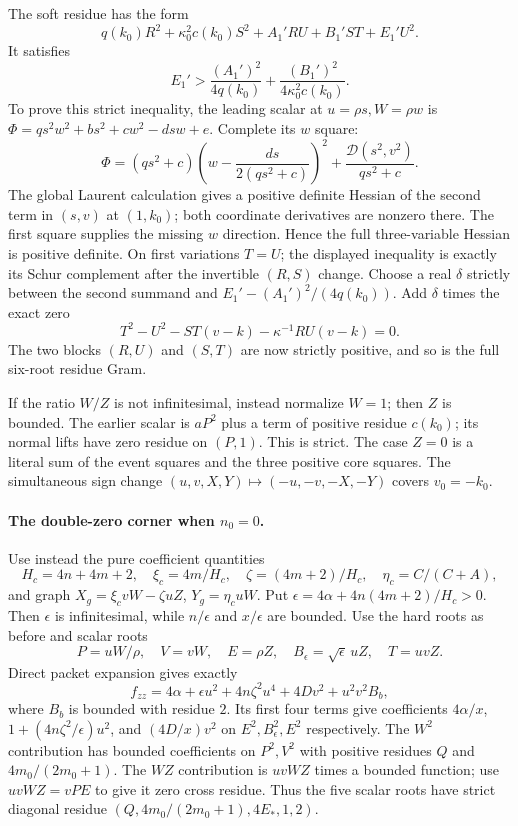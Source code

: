 The soft residue has the form
\[
 q(k_0)R^2+\kappa_0^2c(k_0)S^2+A_1'RU+B_1'ST+E_1'U^2.
\]
It satisfies
\[
 E_1'>\frac{(A_1')^2}{4q(k_0)}+
          \frac{(B_1')^2}{4\kappa_0^2c(k_0)}.
\]
To prove this strict inequality, the leading scalar at
$u=\rho s,W=\rho w$ is
$\Phi=q s^2w^2+b s^2+c w^2-dsw+e$.
Complete its $w$ square:
\[
 \Phi=(qs^2+c)\left(w-\frac{ds}{2(qs^2+c)}\right)^2
           +\frac{\mathcal D(s^2,v^2)}{qs^2+c}.
\]
The global Laurent calculation gives a positive definite Hessian of
the second term in $(s,v)$ at $(1,k_0)$; both coordinate derivatives
are nonzero there.  The first square supplies the missing $w$
direction.  Hence the full three-variable Hessian is positive
definite.  On first variations $T=U$; the displayed inequality is
exactly its Schur complement after the invertible $(R,S)$ change.
Choose a real $\delta$ strictly between the second summand and
$E_1'-(A_1')^2/(4q(k_0))$.  Add $\delta$ times the exact zero
\[
 T^2-U^2-ST(v-k)-\kappa^{-1}RU(v-k)=0.
\]
The two blocks $(R,U)$ and $(S,T)$ are now strictly positive, and so
is the full six-root residue Gram.

If the ratio $W/Z$ is not infinitesimal, instead normalize $W=1$;
then $Z$ is bounded.  The earlier scalar is $aP^2$ plus a term of
positive residue $c(k_0)$; its normal lifts have zero residue on
$(P,1)$.  This is strict.  The case $Z=0$ is a literal sum of the
event squares and the three positive core squares.  The simultaneous
sign change $(u,v,X,Y)\mapsto(-u,-v,-X,-Y)$ covers $v_0=-k_0$.

\paragraph{The double-zero corner when $n_0=0$.}
Use instead the pure coefficient quantities
\[
 H_c=4n+4m+2,\quad \xi_c=4m/H_c,\quad
 \zeta=(4m+2)/H_c,\quad \eta_c=C/(C+A),
\]
and graph $X_g=\xi_cvW-\zeta uZ$, $Y_g=\eta_cuW$.
Put $\epsilon=4\alpha+4n(4m+2)/H_c>0$.
Then $\epsilon$ is infinitesimal, while $n/\epsilon$ and
$x/\epsilon$ are bounded.  Use the hard roots as before and scalar
roots
\[
 P=uW/\rho,\quad V=vW,\quad E=\rho Z,\quad
 B_\epsilon=\sqrt\epsilon\,uZ,\quad T=uvZ.
\]
Direct packet expansion gives exactly
\[
 f_{zz}=4\alpha+\epsilon u^2+4n\zeta^2u^4+4Dv^2
                         +u^2v^2 B_b,
\]
where $B_b$ is bounded with residue $2$.  Its first four terms
give coefficients $4\alpha/x$, $1+(4n\zeta^2/\epsilon)u^2$,
and $(4D/x)v^2$ on $E^2,B_\epsilon^2,E^2$ respectively.  The
$W^2$ contribution has bounded coefficients on $P^2,V^2$ with
positive residues $Q$ and $4m_0/(2m_0+1)$.  The $WZ$ contribution
is $uvWZ$ times a bounded function; use $uvWZ=vPE$ to give it zero
cross residue.  Thus the five scalar roots have strict diagonal
residue $(Q,4m_0/(2m_0+1),4E_*,1,2)$.

